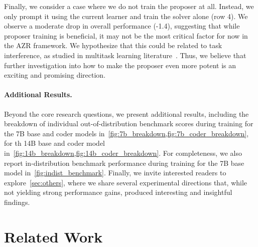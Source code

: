 \documentclass{article}
\begin{document}
Finally, we consider a case where we do not train the proposer at all. Instead, we only prompt it using the current learner and train the solver alone (row 4). We observe a moderate drop in overall performance (-1.4), suggesting that while proposer training is beneficial, it may not be the most critical factor for now in the AZR framework. We hypothesize that this could be related to task interference, as studied in multitask learning literature~\citep{suteu2019regularizing}. Thus, we believe that further investigation into how to make the proposer even more potent is an exciting and promising direction.


\paragraph{Additional Results.}
Beyond the core research questions, we present additional results, including the breakdown of individual out-of-distribution benchmark scores during training for the 7B base and coder models in~\cref{fig:7b_breakdown,fig:7b_coder_breakdown}, for th 14B base and coder model in~\cref{fig:14b_breakdown,fig:14b_coder_breakdown}. For completeness, we also report in-distribution benchmark performance during training for the 7B base model in~\cref{fig:indist_benchmark}. Finally, we invite interested readers to explore~\cref{sec:others}, where we share several experimental directions that, while not yielding strong performance gains, produced interesting and insightful findings.

\section{Related Work}
\label{sec:related_work}
\end{document}
